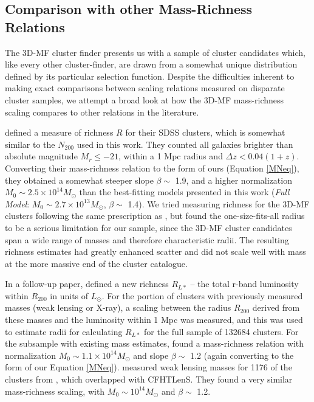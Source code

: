 
\subsection{Comparison with other Mass-Richness Relations}

The \ac{3D-MF} cluster finder presents us with a sample of cluster candidates which, like every other cluster-finder, are drawn from a somewhat unique distribution defined by its particular selection function. Despite the difficulties inherent to making exact comparisons between scaling relations measured on disparate cluster samples, we attempt a broad look at how the \ac{3D-MF} mass-richness scaling compares to other relations in the literature.

\citet{Wen09} defined a measure of richness $R$ for their SDSS clusters, which is somewhat similar to the $N_{200}$ used in this work. They counted all galaxies brighter than absolute magnitude $M_r \leq -21$, within a 1 \ac{Mpc} radius and $\Delta z < 0.04(1+z)$. Converting their mass-richness relation to the form of ours (Equation \ref{MNeq}), they obtained a somewhat steeper slope $\beta \sim$ 1.9, and a higher normalization $M_0 \sim 2.5\times10^{14} M_{\odot}$ than the best-fitting models presented in this work ({\it Full Model}: $M_0 \sim 2.7\times10^{13} M_{\odot}$, $\beta \sim$ 1.4). We tried measuring richness for the \ac{3D-MF} clusters following the same prescription as \citet{Wen09}, but found the one-size-fits-all radius to be a serious limitation for our sample, since the \ac{3D-MF} cluster candidates span a wide range of masses and therefore characteristic radii. The resulting richness estimates had greatly enhanced scatter and did not scale well with mass at the more massive end of the cluster catalogue.

In a follow-up paper, \citet{Wen12} defined a new richness $R_{L*}$ -- the total r-band luminosity within $R_{200}$ in units of $L_{\odot}$. For the portion of clusters with previously measured masses (weak lensing or X-ray), a scaling between the radius $R_{200}$ derived from these masses and the luminosity within 1 \ac{Mpc} was measured, and this was used to estimate radii for calculating $R_{L*}$ for the full sample of 132684 clusters. For the subsample with existing mass estimates, \citet{Wen12} found a mass-richness relation with normalization $M_0 \sim 1.1 \times 10^{14} M_{\odot}$ and slope $\beta \sim$ 1.2 (again converting to the form of our Equation \ref{MNeq}). \citet{Covone14} measured weak lensing masses for 1176 of the clusters from \citet{Wen12}, which overlapped with \ac{CFHTLenS}. They found a very similar mass-richness scaling, with $M_0 \sim 10^{14} M_{\odot}$ and $\beta \sim$ 1.2. 

